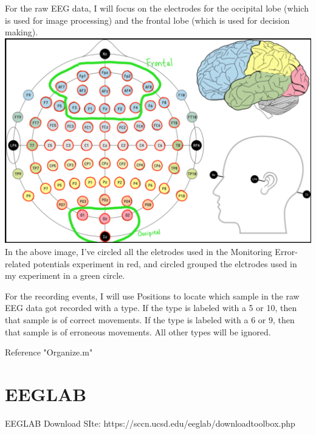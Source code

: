 \documentclass[12pt]{article}
\begin{document}
For the raw EEG data, I will focus on the electrodes for the occipital lobe (which is used for image processing) and the frontal lobe (which is used for decision making).\newline
\includegraphics[scale=0.4]{ElectrodePlacements}\newline
In the above image, I've circled all the eletrodes used in the Monitoring Error-related potentials experiment in red, and circled grouped the elctrodes used in my experiment in a green circle.

For the recording events, I will use Positions to locate which sample in the raw EEG data got recorded with a type. If the type is labeled with a 5 or 10, then that sample is of correct movements. If the type is labeled with a 6 or 9, then that sample is of erroneous movements. All other types will be ignored.

Reference "Organize.m"

\section{EEGLAB}
EEGLAB Download SIte: https://sccn.ucsd.edu/eeglab/downloadtoolbox.php
\end{document}
